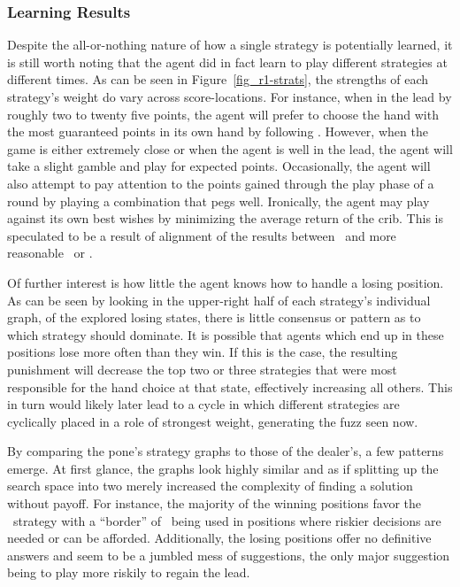 



\subsubsection{Learning Results}


Despite the all-or-nothing nature of how a single strategy is potentially
learned,
it is still worth noting that the agent did in fact learn to play different
strategies at different times.
%
As can be seen in Figure~\ref{fig_r1-strats},
the strengths of each strategy's weight do vary across score-locations.
%
For instance, when in the lead by
roughly two to twenty five points,
the agent will prefer to choose the hand with the most guaranteed
points in its own hand
by following \handmaxmin.
%
However, when the game is either extremely close
or when the agent is well in the lead,
the agent will take a slight gamble and play for expected points.
%
Occasionally, the agent will also attempt to pay attention to the points
gained through the play phase of a round by playing a combination that pegs
well.
%
Ironically,
the agent may play against its own best wishes by minimizing the average return
of the crib.
%
This is speculated to be a result of alignment of the results between
\cribminavg\ and more reasonable \handmaxmin\
or \handmaxavg.

Of further interest is how little the agent knows how to handle a losing
position.
%
As can be seen by looking in the upper-right half of each strategy's
individual graph,
of the explored losing states,
there is little consensus or pattern as to which strategy should dominate.
%
It is possible that agents which end up in these positions lose more often than
they win.
%
If this is the case,
the resulting punishment will decrease the top two or three strategies that were
most responsible for the hand choice at that state,
effectively increasing all others.
%
This in turn would likely later lead to a cycle in which different strategies
are cyclically placed in a role of strongest weight,
generating the fuzz seen now.



By comparing the pone's strategy graphs to those of the dealer's,
a few patterns emerge.
%
At first glance,
the graphs look highly similar and as if splitting up the search space into two
merely increased the complexity of finding a solution without payoff.
%
For instance,
the majority of the winning positions favor the \handmaxmin\ strategy with
a ``border'' of \handmaxavg\ being used in positions where riskier decisions
are needed or can be afforded.
%
Additionally, the losing positions offer no definitive answers and seem to be a
jumbled mess of suggestions,
the only major suggestion being to play more riskily to regain the lead.

